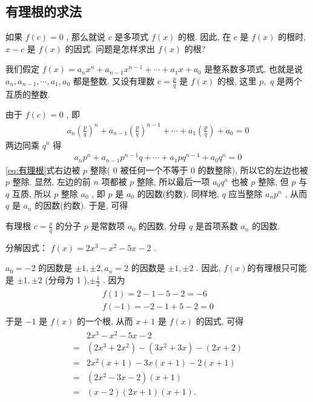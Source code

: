 \subsection{有理根的求法}
如果 $f(c)=0$ , 那么就说 $c$ 是多项式 $f(x)$ 的根. 因此, 在 $c$ 是 $f(x)$ 的根时,  $x-c$ 是 $f(x)$ 的因式. 问题是怎样求出 $f(x)$ 的根?

我们假定 $f(x)=a_{n} x^{n}+a_{n-1} x^{n-1}+\cdots+a_{1} x+a_{0}$ 是整系数多项式, 也就是说 $a_{n}, a_{n-1}, \cdots, a_{1}, a_{0}$ 都是整数. 又设有理数 $c=\frac{p}{q}$ 是 $f(x)$ 的根, 这里 $p , $ $q$ 是两个互质的整数.

由于 $f(c)=0$ , 即
\begin{align*}
	a_{n}\left(\frac{p}{q}\right)^{n}+a_{n-1}\left(\frac{p}{q}\right)^{n-1}+\cdots+a_{1}\left(\frac{p}{q}\right)+a_{0}=0
\end{align*}
两边同乘 $q^{n}$ 得
\begin{align}\label{eq:有理根}
	a_{n} p^{n}+a_{n-1} p^{n-1} q+\cdots+a_{1} p q^{n-1}+a_{0} q^{n}=0
\end{align}
\ref{eq:有理根}式右边被 $p$ 整除( 0 被任何一个不等于 0 的数整除), 所以它的左边也被 $p$ 整除. 显然, 左边的前 $n$ 项都被 $p$ 整除, 所以最后一项 $a_{0} q^{n}$ 也被 $p$ 整除, 但 $p$ 与 $q$ 互质, 所以 $p$ 整除 $a_{0}$ , 即 $p$ 是 $a_{0}$ 的因数(约数). 同样地,  $q$ 应当整除 $a_{n} p^{n}$ , 从而 $q$ 是 $a_{n}$ 的因数(约数). 于是, 可得

有理根 $c=\frac{p}{q}$ 的分子 $p$ 是常数项 $a_{0}$ 的因数, 分母 $q$ 是首项系数 $a_{n}$ 的因数.

\begin{example}
	分解因式： $f(x)=2 x^{3}-x^{2}-5 x-2$ .
\end{example}
\begin{solution}
	$a_{0}=-2$ 的因数是 $\pm 1, \pm 2, a_{n}=2$ 的因数是 $\pm 1, \pm 2$ . 因此,  $f(x)$的有理根只可能是 $\pm 1, \pm 2$ (分母为 1 ),$\pm \frac{1}{2}$ . 因为
	\begin{align*}
		\begin{gathered}
			f(1)=2-1-5-2=-6 \\
			f(-1)=-2-1+5-2=0
		\end{gathered}
	\end{align*}
	于是 $-1$ 是 $f(x)$ 的一个根, 从而 $x+1$ 是 $f(x)$ 的因式, 可得
	\begin{align*}
		\begin{aligned}
			  & 2 x^{3}-x^{2}-5 x-2                                           \\
			= & \left(2 x^{3}+2 x^{2}\right)-\left(3 x^{2}+3 x\right)-(2 x+2) \\
			= & 2 x^{2}(x+1)-3 x(x+1)-2(x+1)                                  \\
			= & \left(2 x^{2}-3 x-2\right)(x+1)                               \\
			= & (x-2)(2 x+1)(x+1) .
		\end{aligned}
	\end{align*}
\end{solution}

